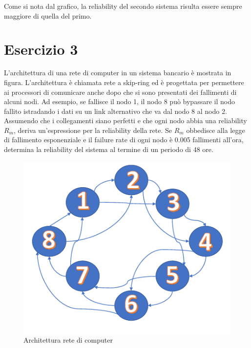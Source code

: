 	Come si nota dal grafico, la reliability del secondo sistema risulta essere sempre maggiore di quella del primo.
	
	\section{Esercizio 3}
	L'architettura di una rete di computer in un sistema bancario è mostrata in 	figura. L'architettura è chiamata rete a skip-ring ed è progettata per permettere ai processori di comunicare anche dopo che si sono presentati dei fallimenti di alcuni nodi. Ad esempio, se fallisce il nodo 1, il nodo 8 può bypassare il nodo fallito istradando i dati su un link alternativo che va dal nodo 8 al nodo 2. Assumendo che i collegamenti siano perfetti e che ogni nodo abbia una reliability $R_{m}$, deriva un'espressione per la reliability della rete. Se $R_{m}$ obbedisce alla legge di fallimento esponenziale e il failure rate di ogni nodo è 0.005 fallimenti all'ora, determina la reliability del sistema al termine di un periodo di 48 ore.
	
	\begin{figure}[H]
		\centering
		\includegraphics[scale=0.8]{./immagine/reliability_es3.png}
		\caption{Architettura rete di computer}
		\label{fig:reliability_es3}
	\end{figure}
	
